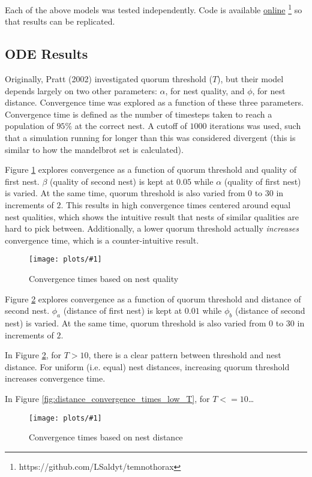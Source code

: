\documentclass{article}
\newcommand{\plot}[3]{
    \begin{figure}[h]
        \texttt{[image: plots/\#1]}
        \caption{#2}
        \label{fig:#1}
    \end{figure}
}
\begin{document}
Each of the above models was tested independently. Code is available \href{https://github.com/LSaldyt/temnothorax}{online} \footnote{https://github.com/LSaldyt/temnothorax} so that results can be replicated. 

\subsection{ODE Results}
Originally, Pratt (2002) investigated quorum threshold ($T$), but their model depends largely on two other parameters: $\alpha$, for nest quality, and $\phi$, for nest distance.
Convergence time was explored as a function of these three parameters. 
Convergence time is defined as the number of timesteps taken to reach a population of $95\%$ at the correct nest.
A cutoff of $1000$ iterations was used, such that a simulation running for longer than this was considered divergent (this is similar to how the mandelbrot set is calculated).

Figure \ref{fig:convergence_times} explores convergence as a function of quorum threshold and quality of first nest. 
$\beta$ (quality of second nest) is kept at $0.05$ while $\alpha$ (quality of first nest) is varied.
At the same time, quorum threshold is also varied from $0$ to $30$ in increments of $2$.
This results in high convergence times centered around equal nest qualities, which shows the intuitive result that nests of similar qualities are hard to pick between.
Additionally, a lower quorum threshold actually \emph{increases} convergence time, which is a counter-intuitive result.

\plot{convergence_times}{Convergence times based on nest quality}{0.6}

Figure \ref{fig:distance_convergence_times} explores convergence as a function of quorum threshold and distance of second nest. 
$\phi_a$ (distance of first nest) is kept at $0.01$ while $\phi_b$ (distance of second nest) is varied.
At the same time, quorum threshold is also varied from $0$ to $30$ in increments of $2$.

In Figure \ref{fig:distance_convergence_times}, for $T > 10$, there is a clear pattern between threshold and nest distance. 
For uniform (i.e. equal) nest distances, increasing quorum threshold increases convergence time.

In Figure \ref{fig:distance_convergence_times_low_T}, for $T <= 10$\dots

\plot{distance_convergence_times}{Convergence times based on nest distance}{0.6}
\end{document}
